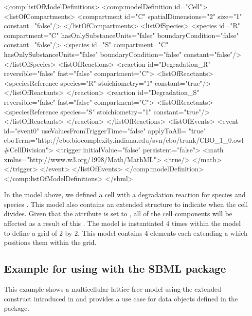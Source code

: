 \begin{example}
	<comp:listOfModelDefinitions>
		<comp:modelDefinition id="Cell">
			<listOfCompartments>
				<compartment id="C" spatialDimensions="2" size="1" constant="false"/>
			</listOfCompartments>
			<listOfSpecies>
				<species id="R" compartment="C" hasOnlySubstanceUnits="false" 
				         boundaryCondition="false" constant="false"/>
				<species id="S" compartment="C" hasOnlySubstanceUnits="false" 
				         boundaryCondition="false" constant="false"/>
			</listOfSpecies>
			<listOfReactions>
				<reaction id="Degradation_R" reversible="false" fast="false" compartment="C">
					<listOfReactants>
						<speciesReference species="R" stoichiometry="1" constant="true"/>
					</listOfReactants>
				</reaction>
				<reaction id="Degradation_S" reversible="false" fast="false" compartment="C">
					<listOfReactants>
						<speciesReference species="S" stoichiometry="1" constant="true"/>
					</listOfReactants>
				</reaction>
			</listOfReactions>
			<listOfEvents>
				<event id="event0" useValuesFromTriggerTime="false" applyToAll= "true"
				  cboTerm="http://cbo.biocomplexity.indiana.edu/svn/cbo/trunk/CBO_1_0.owl#CellDivision">
					<trigger initialValue="false" persistent="false">
						<math xmlns="http://www.w3.org/1998/Math/MathML">
							<true/>
						</math>
					</trigger>
				</event>
			</listOfEvents>
		</comp:modelDefinition>
	</comp:listOfModelDefinitions>
</sbml>


\end{example}

In the model above, we defined a cell with a degradation reaction for species  and species . This model also contains an extended \Event structure to indicate when the cell divides. Given that the  attribute is set to , all of the cell components will be affected as a result of this \Event. The  model is instantiated 4 times within the  model to define a grid of 2 by 2. This model contains 4 \Compartment elements each extending a \ListOfCoordinateComponents which positions them within the grid.

\subsection{Example for using  with the SBML  package}

This example shows a multicellular lattice-free model using the extended \Event construct introduced in  and provides a use case for data objects defined in the  package.

